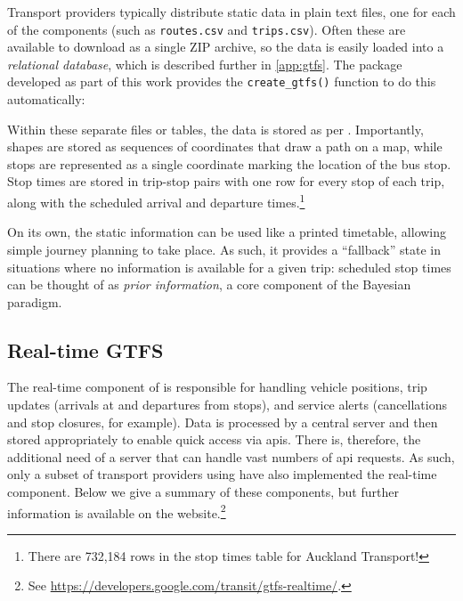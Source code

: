 Transport providers typically distribute static \GTFS{} data in plain text files, one for each of the components (such as \verb+routes.csv+ and \verb+trips.csv+). Often these are available to download as a single ZIP archive, so the data is easily loaded into a \emph{relational database}, which is described further in \cref{app:gtfs}. The \Rstats{} package developed as part of this work provides the \verb+create_gtfs()+ function to do this automatically:
\begin{knitrout}\small
{}\color{fgcolor}\begin{kframe}
\begin{alltt}
 \hlkwb{<-} \hlstd{(}\hlstd{,}  \hlstd{=} \hlstd{)}
\end{alltt}
\end{kframe}
\end{knitrout}


Within these separate files or tables, the data is stored as per \GTFS{}. Importantly, shapes are stored as sequences of coordinates that draw a path on a map, while stops are represented as a single coordinate marking the location of the bus stop. Stop times are stored in trip-stop pairs with one row for every stop of each trip, along with the scheduled arrival and departure times.\footnote{There are 732,184 rows in the stop times table for Auckland Transport!}



On its own, the static \GTFS{} information can be used like a printed timetable, allowing simple journey planning to take place. As such, it provides a ``fallback'' state in situations where no \rt{} information is available for a given trip: scheduled stop times can be thought of as \emph{prior information}, a core component of the Bayesian paradigm.



\subsection{Real-time GTFS}
\label{sec:gtfs_rt}

The real-time component of \GTFS{} is responsible for handling vehicle positions, trip updates (arrivals at and departures from stops), and service alerts (cancellations and stop closures, for example). Data is processed by a central server and then stored appropriately to enable quick access via \glspl{api}. There is, therefore, the additional need of a server that can handle vast numbers of \gls{api} requests. As such, only a subset of transport providers using \GTFS{} have also implemented the real-time component. Below we give a summary of these components, but further information is available on the \GTFS{} website.\footnote{See \url{https://developers.google.com/transit/gtfs-realtime/}.}



